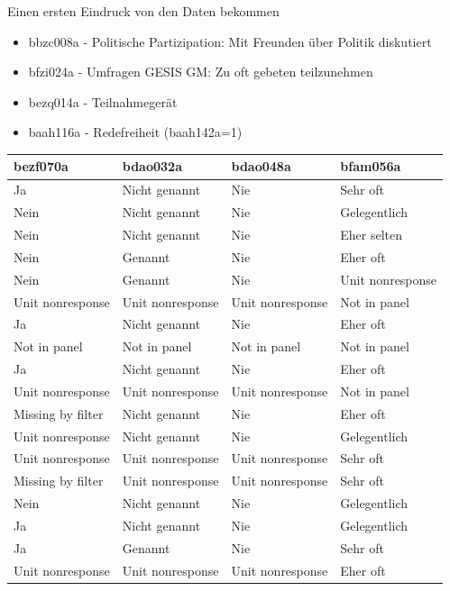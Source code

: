 \documentclass[ignorenonframetext,]{beamer}
\providecommand{\tightlist}{%
  \setlength{\itemsep}{0pt}\setlength{\parskip}{0pt}}
\begin{document}
\begin{frame}{Einen ersten Eindruck von den Daten bekommen}

\begin{itemize}
\tightlist
\item
  bbzc008a - Politische Partizipation: Mit Freunden über Politik
  diskutiert
\item
  bfzi024a - Umfragen GESIS GM: Zu oft gebeten teilzunehmen
\item
  bezq014a - Teilnahmegerät
\item
  baah116a - Redefreiheit (baah142a=1)
\end{itemize}

\begin{tabular}{l|l|l|l}
\hline
bezf070a & bdao032a & bdao048a & bfam056a\\
\hline
Ja & Nicht genannt & Nie & Sehr oft\\
\hline
Nein & Nicht genannt & Nie & Gelegentlich\\
\hline
Nein & Nicht genannt & Nie & Eher selten\\
\hline
Nein & Genannt & Nie & Eher oft\\
\hline
Nein & Genannt & Nie & Unit nonresponse\\
\hline
Unit nonresponse & Unit nonresponse & Unit nonresponse & Not in panel\\
\hline
Ja & Nicht genannt & Nie & Eher oft\\
\hline
Not in panel & Not in panel & Not in panel & Not in panel\\
\hline
Ja & Nicht genannt & Nie & Eher oft\\
\hline
Unit nonresponse & Unit nonresponse & Unit nonresponse & Not in panel\\
\hline
Missing by filter & Nicht genannt & Nie & Eher oft\\
\hline
Unit nonresponse & Nicht genannt & Nie & Gelegentlich\\
\hline
Unit nonresponse & Unit nonresponse & Unit nonresponse & Sehr oft\\
\hline
Missing by filter & Unit nonresponse & Unit nonresponse & Sehr oft\\
\hline
Nein & Nicht genannt & Nie & Gelegentlich\\
\hline
Ja & Nicht genannt & Nie & Gelegentlich\\
\hline
Ja & Genannt & Nie & Sehr oft\\
\hline
Unit nonresponse & Unit nonresponse & Unit nonresponse & Eher oft\\

\end{tabular}
\end{frame}
\end{document}
